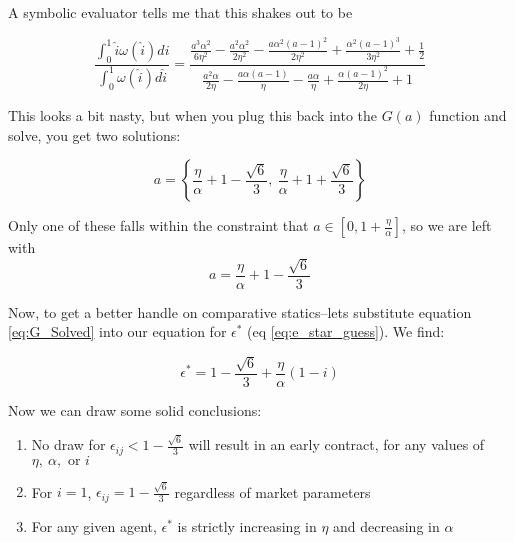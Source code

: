\documentclass[WP]{AEA}
\begin{document}
A symbolic evaluator tells me that this shakes out to be

\begin{equation}
 \frac{\int_0^1 \hat{i} \omega(\hat{i}) di}{\int_0^1  \omega(\hat{i}) d\hat{i}} = \frac{\frac{a^{3} \alpha^{2}}{6 \eta^{2}} - \frac{a^{2} \alpha^{2}}{2 \eta^{2}} - \frac{a \alpha^{2} \left(a - 1\right)^{2}}{2 \eta^{2}} + \frac{\alpha^{2} \left(a - 1\right)^{3}}{3 \eta^{2}} + \frac{1}{2}}{\frac{a^{2} \alpha}{2 \eta} - \frac{a \alpha \left(a - 1\right)}{\eta} - \frac{a \alpha}{\eta} + \frac{\alpha \left(a - 1\right)^{2}}{2 \eta} + 1}
\end{equation}

This looks a bit nasty, but when you plug this back into the $G(a)$ function and solve, you get two solutions:

\begin{equation*}
a = \left\{ \frac{\eta}{\alpha} +1 - \frac{\sqrt{6}}{3} , \   \frac{\eta}{\alpha} + 1 + \frac{\sqrt{6}}{3} \right\}
\end{equation*}

Only one of these falls within the constraint that  $a \in [0,1+\frac{\eta }{\alpha}]$, so we are left with 
\begin{equation} \label{eq:G_Solved}
a =  \frac{\eta}{\alpha} +1 - \frac{\sqrt{6}}{3} 
\end{equation}

Now, to get a better handle on comparative statics--lets substitute equation \ref{eq:G_Solved} into our equation for $\epsilon^*$ (eq \ref{eq:e_star_guess}).  We find:

\begin{equation}
\epsilon^* = 1 - \frac{\sqrt{6}}{3} + \frac{\eta}{\alpha} (1-i)
\end{equation}

Now we can draw some solid conclusions:

\begin{enumerate}
	\item No draw for $\epsilon_{ij} <  1 - \frac{\sqrt{6}}{3} $ will result in an early contract, for any values of $\eta, \ \alpha, \text{ or } i$
	\item For $ i = 1$,  $\epsilon_{ij} =  1 - \frac{\sqrt{6}}{3} $ regardless of market parameters
	\item For any given agent, $\epsilon^* $ is strictly increasing in $\eta$ and decreasing in $\alpha$
\end{enumerate}

%
\end{document}
